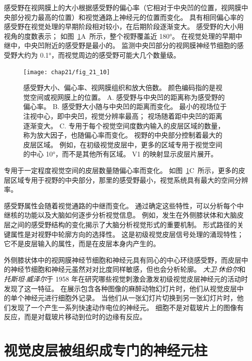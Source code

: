 感受野在视网膜上的大小根据感受野的偏心率（它相对于中央凹的位置，视网膜中央部分视力最高的位置）和视觉通路上神经元的位置而变化。
具有相同偏心率的感受野在视觉处理的早期阶段相对较小，在后期阶段逐渐变大。
感受野的大小用视角的度数表示；
如图~\ref{fig:21_10}A~所示，整个视野覆盖近 180°。
在视觉处理的早期中继中，中央凹附近的感受野是最小的。
监测中央凹部分的视网膜神经节细胞的感受野大约为 0.1°，而视觉周边的感受野可能大几个数量级。


\begin{figure}[htbp]
	\centering
	\texttt{[image: chap21/fig\_21\_10]}
	\caption{感受野大小、偏心率、视网膜组织和放大倍数。
		颜色编码指的是视觉空间或视网膜上的位置。
		A. 感受野与中央凹的距离称为感受野的偏心率。
		B. 感受野大小随与中央凹的距离而变化。
		最小的视场位于注视中心，即中央凹，视觉分辨率最高；
		视场随着距中央凹的距离逐渐变大。
		C. 专用于每个视觉空间度数内输入的皮层区域的数量，称为放大因子，也随偏心率而变化。
		视野的中央部分控制着最大的皮层区域。
		例如，在初级视觉皮层中，更多的区域专用于视觉空间的中心 10°，而不是其他所有区域。
		V1 的映射显示皮层片展开。}
	\label{fig:21_10}
\end{figure}


专用于一定程度视觉空间的皮层数量随偏心率而变化。
如图~\ref{fig:21_10}C~所示，更多的皮层区域专用于视野的中央部分，那里的感受野最小，视觉系统具有最大的空间分辨率。


感受野属性会随着视觉通路的中继而变化。
通过确定这些特性，可以分析每个中继核的功能以及大脑如何逐步分析视觉信息。
例如，发生在外侧膝状体和大脑皮层之间的感受野结构的变化揭示了大脑分析视觉形式的重要机制。
形式路径的关键属性是对视野中轮廓方向的选择性。
这是初级视觉皮层信号处理的涌现特性；
它不是皮层输入的属性，而是在皮层本身内产生的。


外侧膝状体中的视网膜神经节细胞和神经元具有同心的中心环绕感受野，而皮层中的神经节细胞和神经元虽然对对比度同样敏感，但也会分析轮廓。
\textit{大卫$\cdot$休伯尔}和\textit{托斯坦$\cdot$威泽尔}于 1958 年在研究哪些视觉刺激会激发初级视觉皮层神经元的活动时发现了这一特征。
在展示包含各种图像的麻醉动物幻灯片时，他们从视觉皮层中的单个神经元进行细胞外记录。
当他们从一张幻灯片切换到另一张幻灯片时，他们发现了一个产生一系列快速动作电位的神经元。
细胞不是对载玻片上的图像有反应，而是对载玻片移动到位时的边缘有反应。



\section{视觉皮层被组织成专门的神经元柱}

